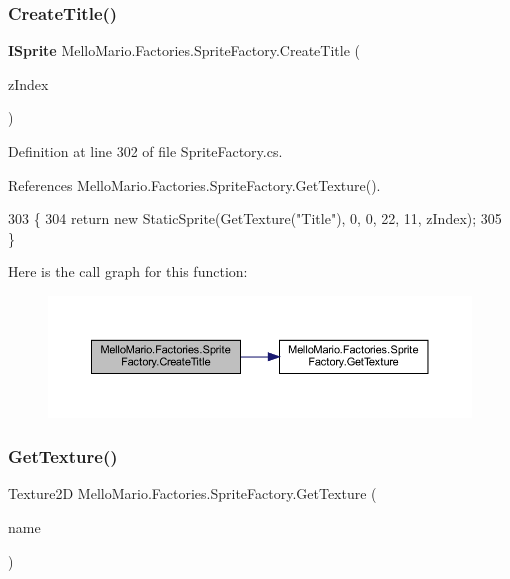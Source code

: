 \subsubsection{Create\+Title()}
{\footnotesize\ttfamily \textbf{ I\+Sprite} Mello\+Mario.\+Factories.\+Sprite\+Factory.\+Create\+Title (\begin{DoxyParamCaption}\item[{\textbf{ Z\+Index}}]{z\+Index }\end{DoxyParamCaption})}



Definition at line 302 of file Sprite\+Factory.\+cs.



References Mello\+Mario.\+Factories.\+Sprite\+Factory.\+Get\+Texture().


\begin{DoxyCode}
303         \{
304             \textcolor{keywordflow}{return} \textcolor{keyword}{new} StaticSprite(GetTexture(\textcolor{stringliteral}{"Title"}), 0, 0, 22, 11, zIndex);
305         \}
\end{DoxyCode}
Here is the call graph for this function\+:
\nopagebreak
\begin{figure}[H]
\begin{center}
\leavevmode
\includegraphics[width=350pt]{classMelloMario_1_1Factories_1_1SpriteFactory_a4310b74d9b5975a309ee1c12ee33f96e_cgraph}
\end{center}
\end{figure}
\mbox{\label{classMelloMario_1_1Factories_1_1SpriteFactory_a1030a47545499fbe9d96173df465b349}} 
\subsubsection{Get\+Texture()}
{\footnotesize\ttfamily Texture2D Mello\+Mario.\+Factories.\+Sprite\+Factory.\+Get\+Texture (\begin{DoxyParamCaption}\item[{string}]{name }\end{DoxyParamCaption})\hspace{0.3cm}{\ttfamily [private]}}



